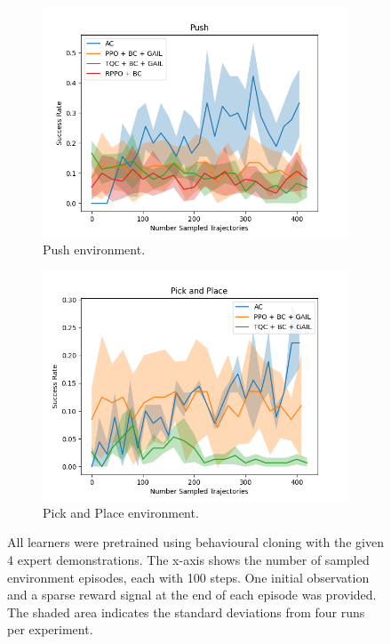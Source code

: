 \begin{figure}[htbp]
\begin{subfigure}[b]{0.45\textwidth}
    \includegraphics[width=\textwidth]{images/4_400/Push.png}
    \caption{Push environment.}
    \label{fig:plot3}
  \end{subfigure}
  \hfill
  \begin{subfigure}[b]{0.45\textwidth}
    \includegraphics[width=\textwidth]{images/4_400/Pick and Place.png}
    \caption{Pick and Place environment.}
    \label{fig:plot4}
  \end{subfigure}
  \caption{All learners were pretrained using behavioural cloning with the given 4 expert demonstrations. 
  The x-axis shows the number of sampled environment episodes, each with 100 steps.  One initial observation and a sparse reward signal at the end of each episode was provided. 
  The shaded area indicates the standard deviations from four runs per experiment.}
  \label{fig:4}
\end{figure}

